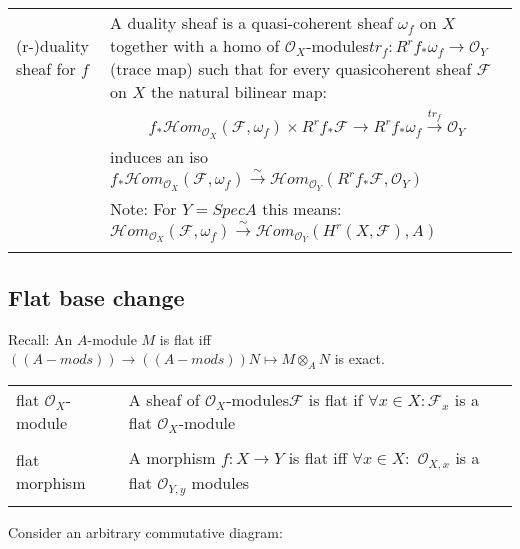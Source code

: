 \documentclass[a4paper, 12pt]{article}
\newcommand{\ca}[1]{\mathcal{#1}}
\newcommand{\caf}{\mathcal{F}}
\newcommand{\oxmod}{$\mathcal{O}_X$-module }
\newcommand{\oxmods}{$\mathcal{O}_X$-modules}
\newcommand{\ox}{\mathcal{O}_X}
\newcommand{\oy}{\mathcal{O}_Y}
\newcommand{\oxx}{\mathcal{O}_{X,x}}
\newcommand{\oyy}{\mathcal{O}_{Y,y}}
\begin{document}
\begin{longtable}{p{}  p{} }

  (r-)duality sheaf for $f$ & A duality sheaf is a quasi-coherent sheaf $\omega_f$ on $X$ together with a homo of \oxmods $tr_f:R^rf_*\omega_f \longrightarrow \oy $ (trace map) such that for every quasicoherent sheaf $\caf$ on $X$ the natural bilinear map:\\

  &  \[  f_* \ca{H}om_{\ox}(\caf, \omega_f) \times R^rf_* \caf \longrightarrow R^rf_*\omega_f \xrightarrow{tr_f} \oy\]\\

  & induces an iso $f_*\ca{H}om_{\ox}(\caf, \omega_f) \xrightarrow{\sim} \ca{H}om_{\oy}(R^rf_*\caf , \oy)$ \\

  & Note: For $Y = Spec A$ this means: $\ca{H}om_{\ox}(\caf, \omega_f) \xrightarrow{\sim} \ca{H}om_{\oy}(H^r(X,\caf) , A)$\\

  &\\
  
\end{longtable}


\subsection{Flat base change}

Recall: An $A$-module $M$ is flat iff $((A-mods))\longrightarrow ((A-mods)) N\mapsto M\otimes_A N$ is exact.

\begin{longtable}{p{}  p{} }

  flat \oxmod & A sheaf of \oxmods $\caf$ is flat if $\forall x \in X: \caf_x$ is a flat \oxmod\\

  &\\

  flat morphism & A morphism $f:X\longrightarrow Y$ is flat iff $\forall x \in X:$ $\oxx$ is a flat $\oyy$ modules\\

  &\\
  
\end{longtable}

Consider an arbitrary commutative diagram:

\end{document}
